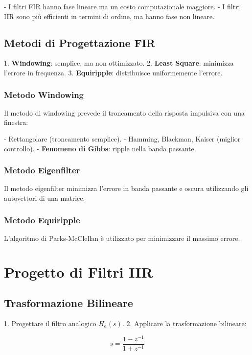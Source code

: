 - I filtri FIR hanno fase lineare ma un costo computazionale maggiore.
- I filtri IIR sono più efficienti in termini di ordine, ma hanno fase non lineare.

\subsection*{Metodi di Progettazione FIR}

1. \textbf{Windowing}: semplice, ma non ottimizzato.
2. \textbf{Least Square}: minimizza l'errore in frequenza.
3. \textbf{Equiripple}: distribuisce uniformemente l'errore.

\subsubsection*{Metodo Windowing}

Il metodo di windowing prevede il troncamento della risposta impulsiva con una finestra:

- Rettangolare (troncamento semplice).
- Hamming, Blackman, Kaiser (miglior controllo).
- \textbf{Fenomeno di Gibbs}: ripple nella banda passante.

\subsubsection*{Metodo Eigenfilter}

Il metodo eigenfilter minimizza l'errore in banda passante e oscura utilizzando gli autovettori di una matrice.

\subsubsection*{Metodo Equiripple}

L'algoritmo di Parks-McClellan è utilizzato per minimizzare il massimo errore.

\section{Progetto di Filtri IIR}

\subsection*{Trasformazione Bilineare}

1. Progettare il filtro analogico \( H_a(s) \).
2. Applicare la trasformazione bilineare:

\[
s = \frac{1 - z^{-1}}{1 + z^{-1}}
\]

